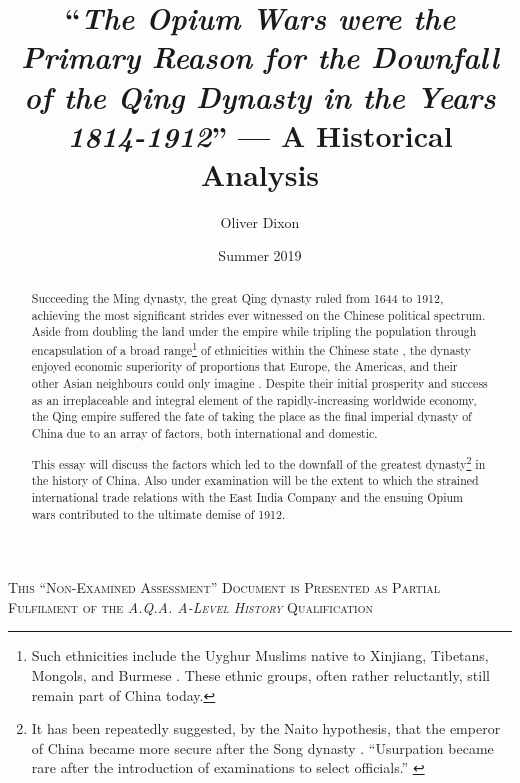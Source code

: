 \documentclass{article}
\title{``\emph{The Opium Wars were the Primary Reason for the Downfall of the Qing Dynasty in the Years 1814-1912}'' --- A Historical Analysis}
\author{Oliver Dixon}
\date{Summer 2019}
\newcommand{\textrule}{\noindent\makebox[\linewidth]{\rule{\linewidth}{0.4pt}}}
\begin{document}
\clearpage\maketitle
\thispagestyle{titlehdr}
\pagestyle{stdhdr}

\vspace*{-1.5em}
\begin{figure}[h!]
	\centering
	\def\svgwidth{0.5\linewidth}
	
\end{figure}
\vspace*{-0.5em}

\begin{abstract}

	Succeeding the Ming dynasty, the great Qing dynasty ruled from 1644 to 1912, achieving the most significant strides ever witnessed on the Chinese political spectrum. Aside from doubling the land under the empire
	\autocite{Turchin:2006} while tripling the population through encapsulation of a broad range\footnote{Such ethnicities include the Uyghur Muslims native to Xinjiang, Tibetans, Mongols, and Burmese
	\autocite{Chia:1993}. These ethnic groups, often rather reluctantly, still remain part of China today.} of ethnicities within the Chinese state
	\autocite{Rowe:2012}, the dynasty enjoyed economic superiority of proportions that Europe, the Americas, and their other Asian neighbours could only imagine 
	\autocite{Maddison:2007}. Despite their initial prosperity and success as an irreplaceable and integral element of the rapidly-increasing worldwide economy, the Qing empire suffered the fate of taking the place as the final imperial dynasty of China due to an array of factors, both international and domestic.

	This essay will discuss the factors which led to the downfall of the greatest dynasty\footnote{It has been repeatedly suggested, by the Naito hypothesis, that the emperor of China became more secure after the Song dynasty
	\autocite{Miyakawa:1955}. ``Usurpation became rare after the introduction of examinations to select officials.''
	\autocite{Sng:2014}} in the history of China. Also under examination will be the extent to which the strained international trade relations with the East India Company and the ensuing Opium wars contributed to the ultimate demise of 1912.

\end{abstract}

\textrule
\vspace*{0.6em}
{\centering \textsc{This ``Non-Examined Assessment'' Document is Presented as Partial Fulfilment of the \textit{A.Q.A. A-Level History} Qualification}\\}
\textrule
\end{document}
